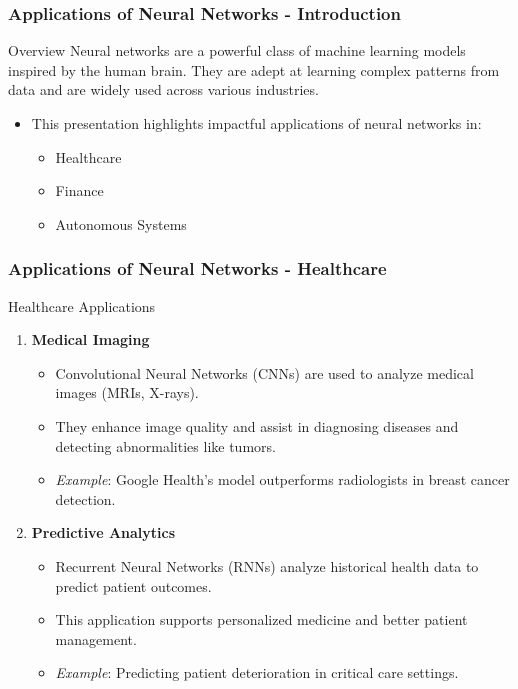 \documentclass[aspectratio=169]{beamer}
\begin{document}
\begin{frame}[fragile]
    \frametitle{Applications of Neural Networks - Introduction}
    \begin{block}{Overview}
        Neural networks are a powerful class of machine learning models inspired by the human brain. They are adept at learning complex patterns from data and are widely used across various industries.
    \end{block}
    \begin{itemize}
        \item This presentation highlights impactful applications of neural networks in:
        \begin{itemize}
            \item Healthcare
            \item Finance
            \item Autonomous Systems
        \end{itemize}
    \end{itemize}
\end{frame}

\begin{frame}[fragile]
    \frametitle{Applications of Neural Networks - Healthcare}
    \begin{block}{Healthcare Applications}
        \begin{enumerate}
            \item \textbf{Medical Imaging}
            \begin{itemize}
                \item Convolutional Neural Networks (CNNs) are used to analyze medical images (MRIs, X-rays).
                \item They enhance image quality and assist in diagnosing diseases and detecting abnormalities like tumors.
                \item \textit{Example}: Google Health's model outperforms radiologists in breast cancer detection.
            \end{itemize}
            \item \textbf{Predictive Analytics}
            \begin{itemize}
                \item Recurrent Neural Networks (RNNs) analyze historical health data to predict patient outcomes.
                \item This application supports personalized medicine and better patient management.
                \item \textit{Example}: Predicting patient deterioration in critical care settings.
            \end{itemize}
        \end{enumerate}
    \end{block}
\end{frame}
\end{document}
